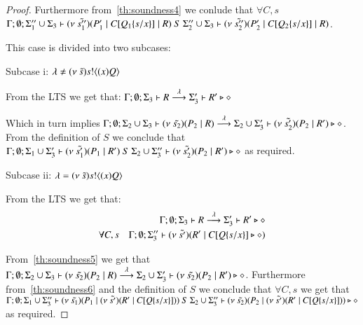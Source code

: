 \begin{proof}
	Furthermore from~\ref{th:soundness4} we conlude that $\forall C, s$
	$\Gamma; \emptyset; \Sigma_1'' \cup \Sigma_3 \vdash (\nu\ \tilde{s_1''})(P_1' \;|\; C[Q_1\{s/x \}] \;|\; R)\ S\ \Sigma_2'' \cup \Sigma_3 \vdash (\nu\ \tilde{s_2''})(P_2' \;|\; C[Q_2\{s/x \}] \;|\; R)$.



	This case is divided into two subcases:

	\noi Subcase i: $\lambda \not= (\nu\ \tilde{s}) s ! \langle (x)Q \rangle$

	From the LTS we get that:
	$\Gamma; \emptyset; \Sigma_3 \vdash R \stackrel{\lambda}{\longrightarrow} \Sigma_3' \vdash R' \triangleright \diamond \label{th:soundness5}$

	Which in turn implies
	$\Gamma; \emptyset; \Sigma_2 \cup \Sigma_3 \vdash (\nu\ \tilde{s_2})(P_2 \;|\; R) \stackrel{\lambda}{\longrightarrow} \Sigma_2 \cup \Sigma_3' \vdash (\nu\ \tilde{s_2'})(P_2 \;|\; R') \triangleright \diamond$.
	From the definition of $S$ we conclude that
	$\Gamma; \emptyset; \Sigma_1 \cup \Sigma_3' \vdash (\nu\ \tilde{s_1'})(P_1 \;|\; R')\ S\ \Sigma_2 \cup \Sigma_3'' \vdash (\nu\ \tilde{s_2'})(P_2 \;|\; R') \triangleright \diamond$ as required.

	\noi Subcase ii: $\lambda = (\nu\ \tilde{s}) s ! \langle (x)Q \rangle$

	From the LTS we get that:
	\begin{eqnarray}
		& &	\Gamma; \emptyset; \Sigma_3 \vdash R \stackrel{\lambda}{\longrightarrow} \Sigma_3' \vdash R' \triangleright \diamond \label{th:soundness5}\\
		\forall C, s& &	\Gamma; \emptyset; \Sigma_3'' \vdash (\nu\ \tilde{s'})(R' \;|\; C[Q \{s/x \}] \triangleright \diamond) \label{th:soundness6}
	\end{eqnarray}

	From~\ref{th:soundness5} we get that
	$\Gamma; \emptyset; \Sigma_2 \cup \Sigma_3 \vdash (\nu\ \tilde{s_2})(P_2 \;|\; R) \stackrel{\lambda}{\longrightarrow} \Sigma_2 \cup \Sigma_3' \vdash (\nu\ \tilde{s_2})(P_2 \;|\; R') \triangleright \diamond$.
	Furthermore from~\ref{th:soundness6} and the definition of $S$ we conclude that
	$\forall C,s$ we get that $\Gamma; \emptyset; \Sigma_1 \cup \Sigma_3'' \vdash (\nu\ \tilde{s_1})(P_1 \;|\; (\nu\ \tilde{s'})(R' \;|\; C[Q \{s/x \}]))\ S\ \Sigma_2 \cup \Sigma_3'' \vdash (\nu\ \tilde{s_2})(P_2 \;|\; (\nu\ \tilde{s'})(R' \;|\; C[Q \{s/x \}])) \triangleright \diamond$ as required.



\end{proof}
